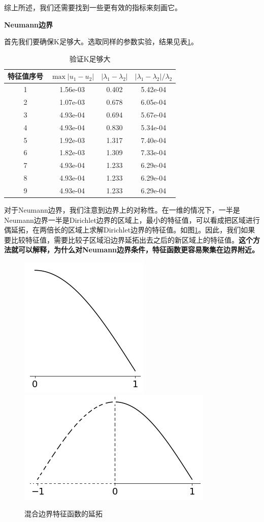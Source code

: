 \documentclass[12pt,a4paper]{article}
\begin{document}
综上所述，我们还需要找到一些更有效的指标来刻画它。

\textbf{Neumann边界}

首先我们要确保K足够大。选取同样的参数实验，结果见表\ref{kN}。

\begin{table}
\centering
\begin{tabular}{c|c|c|c}
\hline
特征值序号 & $\max |u_1 - u_2|$ & $|\lambda_1 - \lambda_2|$ & $|\lambda_1 - \lambda_2| / \lambda_2$ \\
\hline
1 & 1.56e-03 & 0.402 & 5.42e-04 \\
2 & 1.07e-03 & 0.678 & 6.05e-04 \\
3 & 4.93e-04 & 0.694 & 5.67e-04 \\
4 & 4.93e-04 & 0.830 & 5.34e-04 \\
5 & 1.92e-03 & 1.317 & 7.40e-04 \\
6 & 1.82e-03 & 1.309 & 7.33e-04 \\
7 & 4.93e-04 & 1.233 & 6.29e-04 \\
8 & 4.93e-04 & 1.233 & 6.29e-04 \\
9 & 4.93e-04 & 1.233 & 6.29e-04 \\
\hline 
\end{tabular}
\caption{验证K足够大}
\label{kN}
\end{table}

对于Neumann边界，我们注意到边界上的对称性。在一维的情况下，一半是Neumann边界一半是Dirichlet边界的区域上，最小的特征值，可以看成把区域进行偶延拓，在两倍长的区域上求解Dirichlet边界的特征值。如图\ref{expand}。因此，我们如果要比较特征值，需要比较子区域沿边界延拓出去之后的新区域上的特征值。\textbf{这个方法就可以解释，为什么对Neumann边界条件，特征函数更容易聚集在边界附近。}

\begin{figure}[htbp]
\centering
\includegraphics[height=0.15\textheight]{pics/DN}
\includegraphics[height=0.15\textheight]{pics/DD}
\caption{混合边界特征函数的延拓}
\label{expand}
\end{figure}
\end{document}
